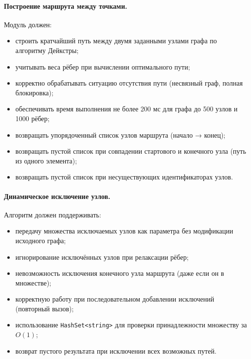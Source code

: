 \paragraph{Построение маршрута между точками.} Модуль должен:
\begin{itemize}
\item строить кратчайший путь между двумя заданными узлами графа по алгоритму Дейкстры;
\item учитывать веса рёбер при вычислении оптимального пути;
\item корректно обрабатывать ситуацию отсутствия пути (несвязный граф, полная блокировка);
\item обеспечивать время выполнения не более 200 мс для графа до 500 узлов и 1000 рёбер;
\item возвращать упорядоченный список узлов маршрута (начало → конец);
\item возвращать пустой список при совпадении стартового и конечного узла (путь из одного элемента);
\item возвращать пустой список при несуществующих идентификаторах узлов.
\end{itemize}

\paragraph{Динамическое исключение узлов.} Алгоритм должен поддерживать:
\begin{itemize}
\item передачу множества исключаемых узлов как параметра без модификации исходного графа;
\item игнорирование исключённых узлов при релаксации рёбер;
\item невозможность исключения конечного узла маршрута (даже если он в множестве);
\item корректную работу при последовательном добавлении исключений (повторный вызов);
\item использование \texttt{HashSet<string>} для проверки принадлежности множеству за $O(1)$;
\item возврат пустого результата при исключении всех возможных путей.
\end{itemize}

